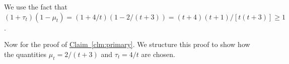 \documentclass{acmsmall}
\newcommand{\cB}{{\cal B}}
\newcommand{\cE}{{\cal E}}
\newcommand{\cF}{{\cal F}}
\newcommand{\cT}{{\cal T}}
\newcommand{\Clm}[1]{\hyperref[clm:#1]{Claim~\ref*{clm:#1}}} %
\newcommand{\kappaest}{\widehat{\kappa}}
\newcommand{\strip}[2]{#1|#2}
\newcommand{\width}{{\bf {\rm  w}}}
\newcommand{\errorterm}{\zeta}
\begin{document}
We use the fact that $(1+\tau_t)(1-\mu_t) = (1+4/t)(1-2/(t+3)) = (t+4)(t+1)/[t(t+3)] \geq 1$.
%
%
%
%
%
%
%
%


Now for the proof of \Clm{primary}. We structure this proof to show how the quantities $\mu_t = 2/(t+3)$ and $\tau_t = 4/t$ are chosen.
\end{document}
